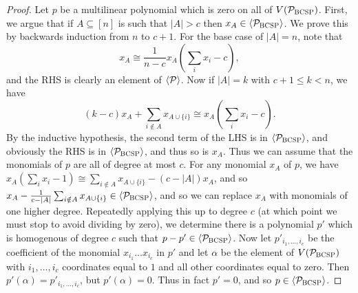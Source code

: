 \begin{proof}
Let $p$ be a multilinear polynomial which is zero on all of $V(\mathcal P_{\textsc{BCSP}})$. First, we argue that if $A \subseteq [n]$ is such that $|A| > c$ then $x_A \in \langle \mathcal P_{\textsc{BCSP}} \rangle$. We prove this by backwards induction from $n$ to $c+1$. For the base case of $|A| = n$, note that 
\[x_A \cong \frac{1}{n-c} x_A\left(\sum_i x_i - c\right),\]
and the RHS is clearly an element of $\langle \mathcal P \rangle$.
Now if $|A| = k$ with $c+1 \leq k < n$, we have
\[\left(k-c\right)x_A + \sum_{i \notin A} x_{A \cup \{i\}} \cong x_A\left(\sum_i x_i - c\right).\]
By the inductive hypothesis, the second term of the LHS is in $\langle \mathcal P_{\textsc{BCSP}} \rangle$, and obviously the RHS is in $\langle \mathcal P_{\textsc{BCSP}} \rangle$, and thus so is $x_A$. Thus we can assume that the monomials of $p$ are all of degree at most $c$. For any monomial $x_A$ of $p$, we have $x_A(\sum_i x_i - 1) \cong \sum_{i \notin A} x_{A \cup \{i\}} - (c-|A|)x_A$, and so $x_A - \frac{1}{c - |A|}\sum_{i \notin A} x_{A \cup \{i\}} \in \langle \mathcal P_{\textsc{BCSP}} \rangle$, and so we can replace $x_A$ with monomials of one higher degree. Repeatedly applying this up to degree $c$ (at which point we must stop to avoid dividing by zero), we determine there is a polynomial $p'$ which is homogenous of degree $c$ such that $p - p' \in \langle \mathcal P_{\textsc{BCSP}} \rangle$. Now let $p'_{i_1,\dots,i_c}$ be the coefficient of the monomial $x_{i_1}\dots x_{i_c}$ in $p'$ and let $\alpha$ be the element of $V(\mathcal P_{\textsc{BCSP}})$ with $i_1,\dots,i_c$ coordinates equal to $1$ and all other coordinates equal to zero. Then $p'(\alpha) = p'_{i_1,\dots,i_c}$, but $p'(\alpha) = 0$. Thus in fact $p' = 0$, and so $p \in \langle \mathcal P_{\textsc{BCSP}} \rangle$.
\end{proof}

